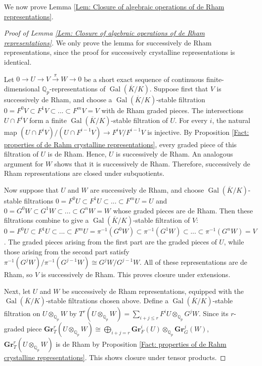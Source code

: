 \documentclass[11pt]{amsart}
\theoremstyle{definition}
\numberwithin{equation}{section}
\numberwithin{equation}{section}
\newcommand\QQ{\mathbb{Q}}
\DeclareMathOperator{\Gal}{Gal}
\newcommand{\catname}[1]{\textbf{#1}}
\newcommand{\Gr}{\catname{Gr}}
\begin{document}
We now prove Lemma \ref{Lem: Closure of algebraic operations of de Rham representations}.

\begin{proof}[Proof of Lemma \ref{Lem: Closure of algebraic operations of de Rham representations}]
We only prove the lemma for successively de Rham representations, since the proof for  successively crystalline representations is identical. 

Let $0\rightarrow U\rightarrow V\xrightarrow{\pi} W\rightarrow 0$ be a short exact sequence of continuous finite-dimensional $\QQ_p$-representations of $\Gal(\overline{K}/K)$. Suppose first that $V$ is successively de Rham, and choose a $\Gal(\overline{K}/K)$-stable filtration $0=F^0V\subset F^1V\subset ...\subset F^mV=V$ with de Rham graded pieces. The intersections $U\cap F^iV$ form a finite $\Gal(\overline{K}/K)$-stable filtration of $U$. For every $i$, the natural map $(U\cap F^iV)/(U\cap F^{i-1}V)\rightarrow F^iV/F^{i-1}V$ is injective. By Proposition \ref{Fact: properties of de Rahm crystalline representations}, every graded piece  of this filtration of $U$ is de Rham. Hence, $U$ is successively de Rham. An analogous argument for $W$ shows that it is successively de Rham. Therefore, successively de Rham representations are closed under subquotients.

Now suppose that $U$ and $W$ are successively de Rham, and choose $\Gal(\overline{K}/K)$-stable filtrations $0=F^0U\subset F^1U\subset ...\subset F^mU=U$ and $0=G^0W\subset G^1W\subset ...\subset G^nW=W$ whose graded pieces are de Rham. Then these filtrations combine to give a $\Gal(\overline{K}/K)$-stable filtration of $V$: $0=F^0U\subset F^1U\subset ...\subset F^mU=\pi^{-1}(G^0W)\subset \pi^{-1}(G^1W)\subset ...\subset \pi^{-1}(G^nW)=V$. The graded pieces arising from the first part are the graded pieces of $U$, while those arising from the second part satisfy $\pi^{-1}(G^{j}W)/\pi^{-1}(G^{j-1}W)\cong G^jW/G^{j-1}W$. All of these representations are de Rham, so $V$ is successively de Rham. This proves closure under extensions. 

Next, let $U$ and $W$ be successively de Rham representations, equipped with the $\Gal(\overline{K}/K)$-stable filtrations chosen above. Define a $\Gal(\overline{K}/K)$-stable filtration on $U\otimes_{\QQ_p}W$ by $T^r(U\otimes_{\QQ_p}W)=\sum_{i+j\leq r}F^iU\otimes_{\QQ_p} G^jW$. Since its $r$-graded piece $\Gr^r_{T}(U\otimes_{\QQ_p}W)\cong \bigoplus_{i+j=r} \Gr^i_{F}(U)\otimes_{\QQ_p}\Gr^j_{G}(W)$, $\Gr^r_{T}(U\otimes_{\QQ_p}W)$ is de Rham by Proposition \ref{Fact: properties of de Rahm crystalline representations}. This shows closure under tensor products. 


\end{proof}
\end{document}
